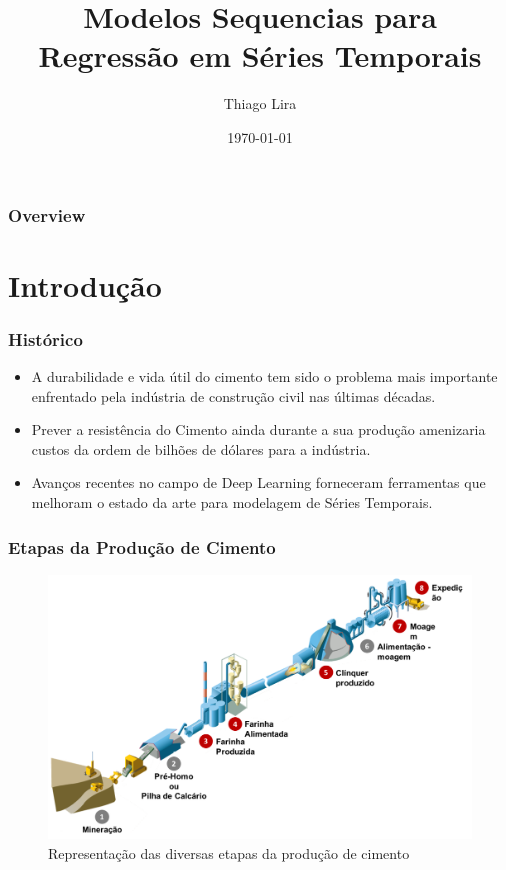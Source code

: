 \documentclass{beamer}
\title{Modelos Sequencias para Regressão em Séries Temporais} %
\author{Thiago Lira} %
\institute[IME-USP] %
{
Instituto de Matemática e Estatística - USP \\ %
\medskip
\textit{thlira@ime.usp.br} %
}
\date{\today} %
\begin{document}
\begin{frame}
\titlepage %
\end{frame}

\begin{frame}
\frametitle{Overview} %
\tableofcontents %
\end{frame}


\section{Introdução}


\begin{frame}
\frametitle{Histórico}

\begin{itemize}
\item A durabilidade e vida útil do cimento tem sido o problema mais importante enfrentado
pela indústria de construção civil nas últimas décadas.
\item Prever a resistência do Cimento ainda durante a sua produção amenizaria
  custos da ordem de bilhões de dólares para a indústria.
\item Avanços recentes no campo de Deep Learning forneceram ferramentas que
  melhoram o estado da arte para modelagem de Séries Temporais.
\end{itemize}

\end{frame}



\begin{frame}
\frametitle{Etapas da Produção de Cimento}
\begin{figure}[H]
\centering
\includegraphics[scale=0.5]{cimento.png}
\caption{Representação das diversas etapas da produção de cimento}
\end{figure}
\end{frame}
\end{document}
